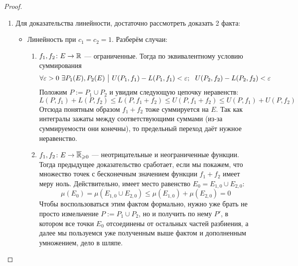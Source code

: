 \begin{proof}~
	\begin{enumerate}
		\item Для доказательства линейности, достаточно рассмотреть доказать 2 факта:
		\begin{itemize}
			\item Линейность при $c_1 = c_2 = 1$. Разберём случаи:
			\begin{enumerate}
				\item $f_1, f_2 \colon E \to \mathbb{R}$ --- ограниченные. Тогда по эквивалентному условию суммирования
				\[
					\forall \varepsilon > 0\ \exists P_1(E), P_2(E) \ \big|\  U(P_1, f_1) - L(P_1, f_1) < \varepsilon;\ \ U(P_2, f_2) - L(P_2, f_2) < \varepsilon
				\]
				Положим $P := P_1 \cup P_2$ и увидим следующую цепочку неравенств:
				\[
					L(P, f_1) + L(P, f_2) \le L(P, f_1 + f_2) \le U(P, f_1 + f_2) \le U(P, f_1) + U(P, f_2)
				\]
				Отсюда понятным образом $f_1 + f_2$ тоже суммируется на $E$. Так как интегралы зажаты между соответствующими суммами (из-за суммируемости они конечны), то предельный переход даёт нужное неравенство.
				
				\item $f_1, f_2 \colon E \to \overline{\mathbb{R}}_{\geqslant 0}$ --- неотрицательные и неограниченные функции. Тогда предыдущее доказательство сработает, если мы покажем, что множество точек с бесконечным значением функции $f_1 + f_2$ имеет меру ноль. Действительно, имеет место равенство $E_0 = E_{1, 0} \cup E_{2, 0}$:
				\[
					\mu(E_0) = \mu(E_{1, 0} \cup E_{2, 0}) \le \mu(E_{1, 0}) + \mu(E_{2, 0}) = 0
				\]
				Чтобы воспользоваться этим фактом формально, нужно уже брать не просто измельчение $P := P_1 \cup P_2$, но и получить по нему $P'$, в котором все точки $E_0$ отсоединены от остальных частей разбиения, а далее мы пользуемся уже полученным выше фактом и дополненным умножением, дело в шляпе.
				

\end{enumerate}
\end{itemize}
\end{enumerate}
\end{proof}
